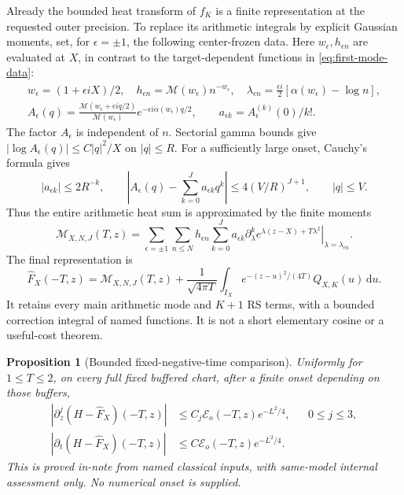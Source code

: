 \documentclass[11pt]{article}
\newcommand{\dd}{\,\mathrm d}
\newcommand{\Mc}{\mathcal M}
\newtheorem{proposition}{Proposition}[section]
\numberwithin{equation}{section}
\begin{document}
Already the bounded heat transform of \(f_K\) is a finite representation
at the requested outer precision. To replace its arithmetic integrals
by explicit Gaussian moments, set, for \(\epsilon=\pm1\), the following
center-frozen data. Here \(w_\epsilon,h_{\epsilon n}\) are evaluated
at \(X\), in contrast to the target-dependent functions in
\eqref{eq:first-mode-data}:
\begin{gather}
 w_\epsilon=(1+\epsilon iX)/2,\quad
 h_{\epsilon n}=\Mc(w_\epsilon)n^{-w_\epsilon},\quad
 \lambda_{\epsilon n}=\frac{\epsilon i}{2}
                    [\alpha(w_\epsilon)-\log n],\\
 A_\epsilon(q)=\frac{\Mc(w_\epsilon+\epsilon iq/2)}{\Mc(w_\epsilon)}
       e^{-\epsilon i\alpha(w_\epsilon)q/2},\qquad
 a_{\epsilon k}=A_\epsilon^{(k)}(0)/k!.
 \label{eq:negative-common-curvature}
\end{gather}
The factor \(A_\epsilon\) is independent of \(n\).
Sectorial gamma bounds give \(|\log A_\epsilon(q)|\le C|q|^2/X\)
on \(|q|\le R\). For a sufficiently large onset, Cauchy's formula gives
\[
 |a_{\epsilon k}|\le2R^{-k},\qquad
 \left|A_\epsilon(q)-\sum_{k=0}^Ja_{\epsilon k}q^k\right|
 \le4(V/R)^{J+1},\qquad |q|\le V.
\]
Thus the entire arithmetic heat sum is approximated by the finite moments
\begin{equation}
 \mathcal M_{X,N,J}(T,z)=\sum_{\epsilon=\pm1}\sum_{n\le N}
 h_{\epsilon n}\sum_{k=0}^J a_{\epsilon k}
 \left.\partial_\lambda^k e^{\lambda(z-X)+T\lambda^2}
 \right|_{\lambda=\lambda_{\epsilon n}}.
 \label{eq:negative-moment-sum}
\end{equation}
The final representation is
\begin{equation}
 \widehat F_X(-T,z)=\mathcal M_{X,N,J}(T,z)
 +\frac1{\sqrt{4\pi T}}\int_{I_X}
       e^{-(z-u)^2/(4T)}Q_{X,K}(u)\dd u.
 \label{eq:negative-finite-representation}
\end{equation}
It retains every main arithmetic mode and \(K+1\) RS terms, with a
bounded correction integral of named functions. It is not a short
elementary cosine or a useful-cost theorem.

\begin{proposition}[Bounded fixed-negative-time comparison]
Uniformly for \(1\le T\le2\), on every full fixed buffered chart,
after a finite onset depending on those buffers,
\begin{align}
 |\partial_z^j(H-\widehat F_X)(-T,z)|
       &\le C_j\mathcal E_o(-T,z)e^{-L^2/4},&&0\le j\le3,
       \label{eq:negative-outer-jets}\\
 |\partial_t(H-\widehat F_X)(-T,z)|
       &\le C\mathcal E_o(-T,z)e^{-L^2/4}.
       \label{eq:negative-outer-time}
\end{align}
This is proved in-note from named classical inputs, with same-model
internal assessment only. No numerical onset is supplied.
\end{proposition}
\end{document}
